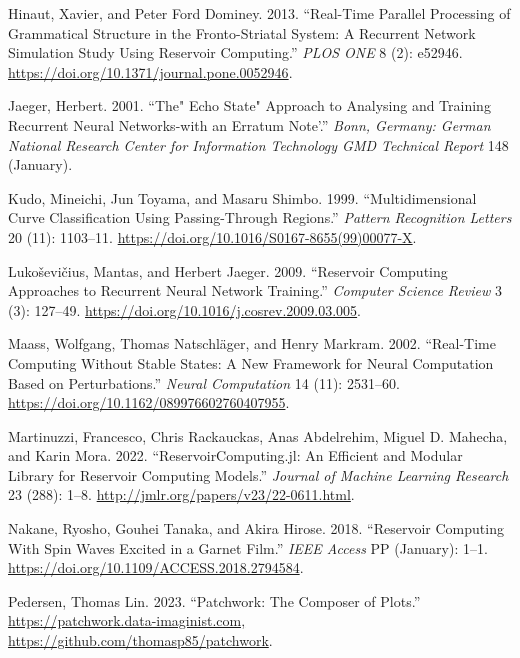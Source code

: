 \documentclass[
  11pt,
  a4paper,
]{article}
\newlength{\cslhangindent}
\newenvironment{CSLReferences}[2] %
 {\begin{list}{}{%
  \setlength{\itemindent}{0pt}
  \setlength{\leftmargin}{0pt}
  \setlength{\parsep}{0pt}
  \ifodd #1
   \setlength{\leftmargin}{\cslhangindent}
   \setlength{\itemindent}{-1\cslhangindent}
  \fi
  \setlength{\itemsep}{#2\baselineskip}}}
 {\end{list}}
\theoremstyle{plain}
\theoremstyle{remark}
\begin{document}
\label{refs}
\begin{CSLReferences}{1}{0}
Hinaut, Xavier, and Peter Ford Dominey. 2013. {``Real-{Time} {Parallel}
{Processing} of {Grammatical} {Structure} in the {Fronto}-{Striatal}
{System}: {A} {Recurrent} {Network} {Simulation} {Study} {Using}
{Reservoir} {Computing}.''} \emph{PLOS ONE} 8 (2): e52946.
\url{https://doi.org/10.1371/journal.pone.0052946}.

Jaeger, Herbert. 2001. {``The" Echo State" Approach to Analysing and
Training Recurrent Neural Networks-with an Erratum Note'.''} \emph{Bonn,
Germany: German National Research Center for Information Technology GMD
Technical Report} 148 (January).

Kudo, Mineichi, Jun Toyama, and Masaru Shimbo. 1999. {``Multidimensional
Curve Classification Using Passing-Through Regions.''} \emph{Pattern
Recognition Letters} 20 (11): 1103--11.
\url{https://doi.org/10.1016/S0167-8655(99)00077-X}.

Lukoševičius, Mantas, and Herbert Jaeger. 2009. {``Reservoir Computing
Approaches to Recurrent Neural Network Training.''} \emph{Computer
Science Review} 3 (3): 127--49.
\url{https://doi.org/10.1016/j.cosrev.2009.03.005}.

Maass, Wolfgang, Thomas Natschläger, and Henry Markram. 2002.
{``Real-Time Computing Without Stable States: A New Framework for Neural
Computation Based on Perturbations.''} \emph{Neural Computation} 14
(11): 2531--60. \url{https://doi.org/10.1162/089976602760407955}.

Martinuzzi, Francesco, Chris Rackauckas, Anas Abdelrehim, Miguel D.
Mahecha, and Karin Mora. 2022. {``{ReservoirComputing}.jl: {An}
{Efficient} and {Modular} {Library} for {Reservoir} {Computing}
{Models}.''} \emph{Journal of Machine Learning Research} 23 (288): 1--8.
\url{http://jmlr.org/papers/v23/22-0611.html}.

Nakane, Ryosho, Gouhei Tanaka, and Akira Hirose. 2018. {``Reservoir
{Computing} {With} {Spin} {Waves} {Excited} in a {Garnet} {Film}.''}
\emph{IEEE Access} PP (January): 1--1.
\url{https://doi.org/10.1109/ACCESS.2018.2794584}.

Pedersen, Thomas Lin. 2023. {``Patchwork: {The} {Composer} of
{Plots}.''}
\href{https://patchwork.data-imaginist.com,\%20https://github.com/thomasp85/patchwork}{https://patchwork.data-imaginist.com,
https://github.com/thomasp85/patchwork}.


\end{CSLReferences}
\end{document}
